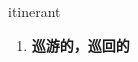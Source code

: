 
\begin{frame}
{\huge itinerant}
\begin{center}
\begin{enumerate}\Large
  \item \textbf{巡游的，巡回的}
\end{enumerate}
\end{center}
\end{frame}
